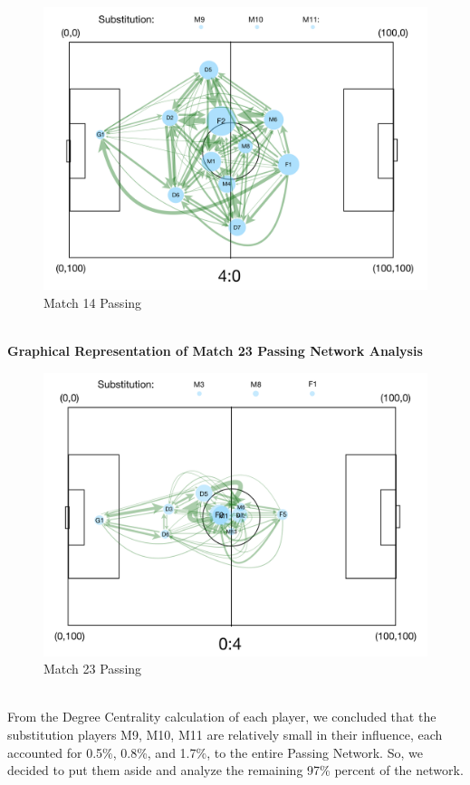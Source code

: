 \documentclass[12pt]{article}
\begin{document}
\begin{figure}[ht]
\begin{center}
\includegraphics[scale=0.34]{images/Wingame.png}
\caption{Match 14 Passing}
\end{center}
\end{figure}\\
\newpage
\textbf{Graphical Representation of Match 23 Passing Network Analysis}
\begin{figure}[ht]
\begin{center}
\includegraphics[scale=0.34]{images/LoseGame.png}
\caption{Match 23 Passing}
\end{center}
\end{figure}\\
From the Degree Centrality calculation of each player, we concluded that the substitution players M9, M10, M11 are relatively small in their influence, each accounted for 0.5\%, 0.8\%, and 1.7\%, to the entire Passing Network. So, we decided to put them aside and analyze the remaining 97\% percent of the network. \\
\end{document}
